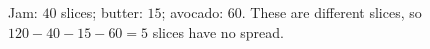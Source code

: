 Jam: $40$ slices; butter: $15$; avocado: $60$. These are different slices, so $120-40-15-60=\boxed{5}$ slices have no spread.

